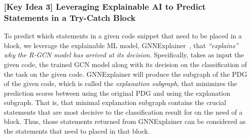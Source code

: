 


\subsubsection{{\bf [Key Idea 3] Leveraging Explainable AI to Predict Statements in a Try-Catch Block}} To predict which statements in a given code snippet that need to be
placed in a  block, we leverage the explainable ML
model, GNNExplainer~\cite{GNNExplainer}, that {\em ``explains'' why
  the R-GCN model has arrived at its decision}. Specifically, {\tool}
takes as input the given code, the trained GCN model along with its
decision on the classification of the task {\xblock} on the given
code. GNNExplainer will produce the subgraph of the PDG of the given
code, which is called the {\em explanation subgraph}, that minimizes
the prediction scores between using the original PDG and using the
explanation subgraph. That is, that minimal explanation subgraph
contains the crucial statements that are most decisive to the
classification result for {\xblock} on the need of a 
block.  Thus, those statements returned from GNNExplainer can be
considered as the statements that need to placed in that
block.
